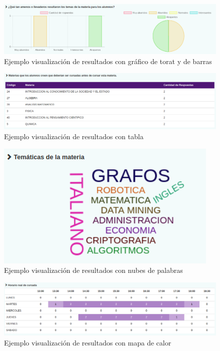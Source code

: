 \documentclass[a4paper]{article}
\begin{document}
\begin{figure}[H]
\centering
\includegraphics[scale=0.35]{Imagenes/resultados_grafico_torta_y_barras.png}\par
\caption{Ejemplo visualización de resultados con gráfico de torat y de barras}
\end{figure}

\begin{figure}[H]
\centering
\includegraphics[scale=0.35]{Imagenes/resultados_con_tabla.png}\par
\caption{Ejemplo visualización de resultados con tabla}
\end{figure}

\begin{figure}[H]
\centering
\includegraphics[scale=0.35]{Imagenes/resultados_nubes_de_palabras.png}\par
\caption{Ejemplo visualización de resultados con nubes de palabras}
\end{figure}

\begin{figure}[H]
\centering
\includegraphics[scale=0.35]{Imagenes/resultados_con_mapa_de_calor.png}\par
\caption{Ejemplo visualización de resultados con mapa de calor}
\end{figure}
\end{document}
